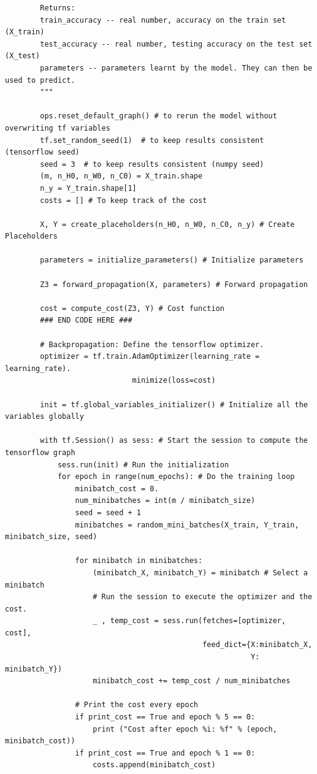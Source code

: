 \documentclass[11pt, a4paper]{article}
\begin{document}
\begin{spacing}{1.1}
\begin{lstlisting}
		Returns:
		train_accuracy -- real number, accuracy on the train set (X_train)
		test_accuracy -- real number, testing accuracy on the test set (X_test)
		parameters -- parameters learnt by the model. They can then be used to predict.
		"""
		
		ops.reset_default_graph() # to rerun the model without overwriting tf variables
		tf.set_random_seed(1)  # to keep results consistent (tensorflow seed)
		seed = 3  # to keep results consistent (numpy seed)
		(m, n_H0, n_W0, n_C0) = X_train.shape             
		n_y = Y_train.shape[1]                            
		costs = [] # To keep track of the cost
		
		X, Y = create_placeholders(n_H0, n_W0, n_C0, n_y) # Create Placeholders 
		
		parameters = initialize_parameters() # Initialize parameters
		
		Z3 = forward_propagation(X, parameters) # Forward propagation
		
		cost = compute_cost(Z3, Y) # Cost function
		### END CODE HERE ###
		
		# Backpropagation: Define the tensorflow optimizer.
		optimizer = tf.train.AdamOptimizer(learning_rate = learning_rate).
		                     minimize(loss=cost)
		
		init = tf.global_variables_initializer() # Initialize all the variables globally
		
		with tf.Session() as sess: # Start the session to compute the tensorflow graph
			sess.run(init) # Run the initialization
			for epoch in range(num_epochs): # Do the training loop
				minibatch_cost = 0.
				num_minibatches = int(m / minibatch_size)
				seed = seed + 1
				minibatches = random_mini_batches(X_train, Y_train, minibatch_size, seed)
				
				for minibatch in minibatches:
					(minibatch_X, minibatch_Y) = minibatch # Select a minibatch
					# Run the session to execute the optimizer and the cost.
					_ , temp_cost = sess.run(fetches=[optimizer, cost], 
					                         feed_dict={X:minibatch_X,
					                                    Y: minibatch_Y})					
					minibatch_cost += temp_cost / num_minibatches
					
				# Print the cost every epoch
				if print_cost == True and epoch % 5 == 0:
					print ("Cost after epoch %i: %f" % (epoch, minibatch_cost))
				if print_cost == True and epoch % 1 == 0:
					costs.append(minibatch_cost) \end{lstlisting}\newpage


\end{spacing}
\end{document}
